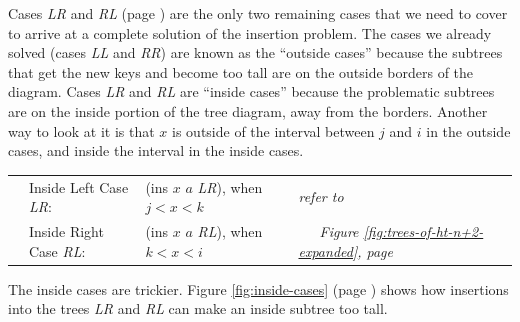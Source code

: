 Cases \emph{LR} and \emph{RL} (page \pageref{cases:ht-n+2})
are the only two remaining cases that we need to cover to arrive
at a complete solution of the insertion problem.
The cases we already solved
(cases \emph{LL} and \emph{RR})
are known as the
``outside cases''
because the subtrees that
get the new keys and become too tall are on the outside borders of the diagram.
Cases \emph{LR} and \emph{RL}
are ``inside cases''
because the problematic subtrees
are on the inside portion of the tree diagram, away from the borders.
Another way to look at it is that $x$ is outside of the interval
between $j$ and $i$ in the outside cases,
and inside the interval in the inside cases.

\begin{center}
\begin{tabular}{llll}
\label{inside-lf} &Inside Left Case \emph{LR}:  &\textsf{(ins $x$ $a$} \emph{LR}\textsf{)}, when $j < x < k$ &
                    \emph{refer to} \\
\label{inside-rt} &Inside Right Case \emph{RL}: &\textsf{(ins $x$ $a$} \emph{RL}\textsf{)}, when $k < x < i$  &~~~\emph{Figure \ref{fig:trees-of-ht-n+2-expanded}, page \pageref{fig:trees-of-ht-n+2-expanded}} \\
\end{tabular}
\end{center}
The inside cases are trickier.
Figure \ref{fig:inside-cases} (page \pageref{fig:inside-cases})
shows how insertions into the trees \emph{LR} and \emph{RL}
can make an inside subtree too tall.

